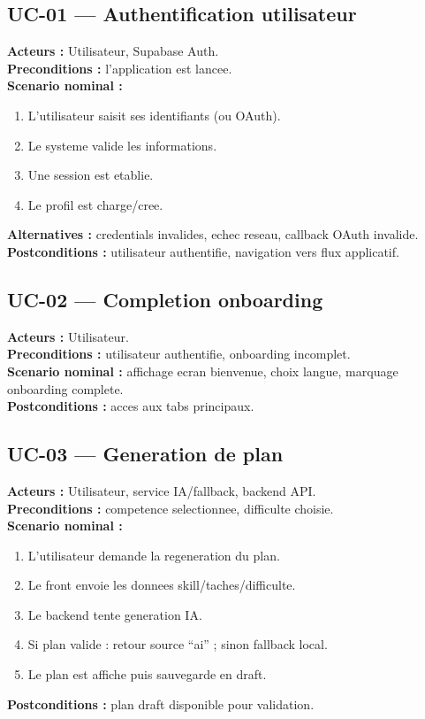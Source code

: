 \documentclass[12pt,a4paper]{article}
\begin{document}
\subsection{UC-01 --- Authentification utilisateur}
\textbf{Acteurs :} Utilisateur, Supabase Auth.\\
\textbf{Preconditions :} l'application est lancee.\\
\textbf{Scenario nominal :}
\begin{enumerate}
  \item L'utilisateur saisit ses identifiants (ou OAuth).
  \item Le systeme valide les informations.
  \item Une session est etablie.
  \item Le profil est charge/cree.
\end{enumerate}
\textbf{Alternatives :} credentials invalides, echec reseau, callback OAuth invalide.\\
\textbf{Postconditions :} utilisateur authentifie, navigation vers flux applicatif.

\subsection{UC-02 --- Completion onboarding}
\textbf{Acteurs :} Utilisateur.\\
\textbf{Preconditions :} utilisateur authentifie, onboarding incomplet.\\
\textbf{Scenario nominal :} affichage ecran bienvenue, choix langue, marquage onboarding complete.\\
\textbf{Postconditions :} acces aux tabs principaux.

\subsection{UC-03 --- Generation de plan}
\textbf{Acteurs :} Utilisateur, service IA/fallback, backend API.\\
\textbf{Preconditions :} competence selectionnee, difficulte choisie.\\
\textbf{Scenario nominal :}
\begin{enumerate}
  \item L'utilisateur demande la regeneration du plan.
  \item Le front envoie les donnees skill/taches/difficulte.
  \item Le backend tente generation IA.
  \item Si plan valide : retour source ``ai'' ; sinon fallback local.
  \item Le plan est affiche puis sauvegarde en draft.
\end{enumerate}
\textbf{Postconditions :} plan draft disponible pour validation.
\end{document}
